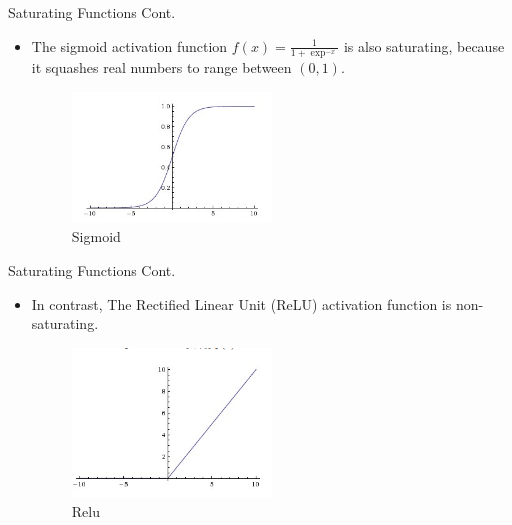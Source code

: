 \begin{frame}{Saturating Functions Cont.}
    \begin{itemize}
            \item The sigmoid activation function  $f(x) = \frac{1}{1+\exp^{-x}}$ is also saturating, because it squashes real numbers to range between $(0, 1)$.
            \begin{figure}[H]
    		     \centering
    		     \includegraphics[width=0.5\textwidth]{Figs/sig.png}
    		     \caption{Sigmoid}
	        \end{figure}            
    \end{itemize}
\end{frame}

\begin{frame}{Saturating Functions Cont.}
    \begin{itemize}
            \item In contrast, The Rectified Linear Unit (ReLU) activation function is non-saturating.
            \begin{figure}[H]
    		     \centering
    		     \includegraphics[width=0.5\textwidth]{Figs/relu.png}
    		     \caption{Relu}
	        \end{figure}             
    \end{itemize}
\end{frame}
